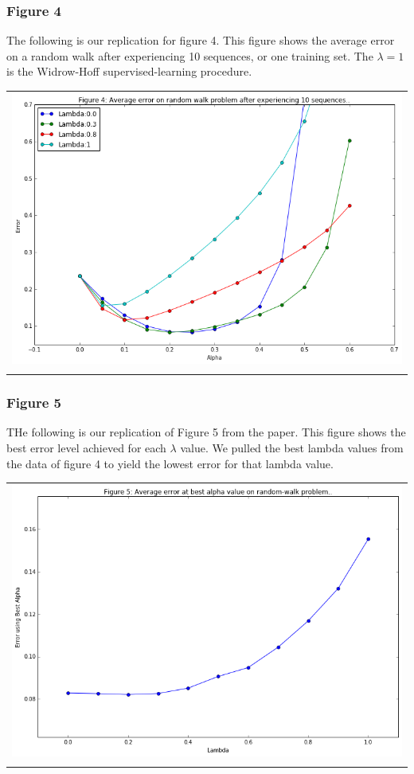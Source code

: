 \documentclass{article}
\begin{document}
\subsubsection{Figure 4}
\label{sec:orgheadline7}
The following is our replication for figure 4. This figure shows the
average error on a random walk after experiencing 10 sequences, or one
training set. The \(\lambda = 1\) is the Widrow-Hoff supervised-learning
procedure.
\begin{center}
\begin{tabular}{l}
\hline
\includegraphics[width=.9\linewidth]{figure4_1.png}\\
\\
\end{tabular}
\end{center}
\subsubsection{Figure 5}
\label{sec:orgheadline8}
THe following is our replication of Figure 5 from the paper. This
figure shows the best error level achieved for each \(\lambda\) 
value. We pulled the best lambda values from the data of figure 4 to
yield the lowest error for that lambda value. 
\begin{center}
\begin{tabular}{l}
\hline
\includegraphics[width=.9\linewidth]{figure5_1.png}\\
\\
\end{tabular}
\end{center}
\end{document}
